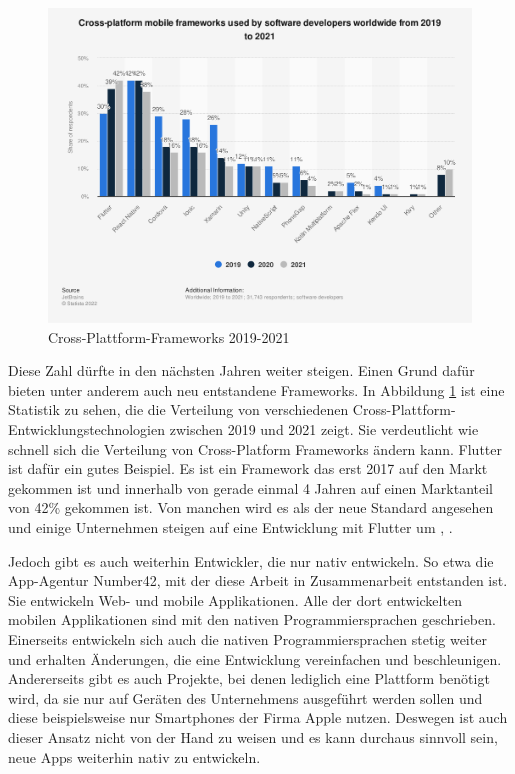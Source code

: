 \begin{figure}[ht]
  \centering
  \includegraphics[width=15cm,keepaspectratio]{images/cross-platform-mobile-frameworks.png} 
  \caption[Statistik Cross-Plattform-Frameworks]{Cross-Plattform-Frameworks 2019-2021 \cite{statist_CP_Framework}}
  \label{fig:statista_cross_plattform}
\end{figure}

Diese Zahl dürfte in den nächsten Jahren weiter steigen. Einen Grund dafür bieten unter anderem auch neu entstandene Frameworks. In Abbildung \ref{fig:statista_cross_plattform} ist eine Statistik zu sehen, die die Verteilung von verschiedenen Cross-Plattform-Entwicklungstechnologien zwischen 2019 und 2021 zeigt. Sie verdeutlicht wie schnell sich die Verteilung von Cross-Platform Frameworks ändern kann. Flutter ist dafür ein gutes Beispiel. Es ist ein Framework das erst 2017 auf den Markt gekommen ist und innerhalb von gerade einmal 4 Jahren auf einen Marktanteil von 42\% gekommen ist. Von manchen wird es als der neue Standard angesehen und einige Unternehmen steigen auf eine Entwicklung mit Flutter um \cite{flutter_move_to}, \cite{flutter_move_to_dart}. 

Jedoch gibt es auch weiterhin Entwickler, die nur nativ entwickeln. So etwa die App-Agentur Number42, mit der diese Arbeit in Zusammenarbeit entstanden ist. Sie entwickeln Web- und mobile Applikationen. Alle der dort entwickelten mobilen Applikationen sind mit den nativen Programmiersprachen geschrieben. Einerseits entwickeln sich auch die nativen Programmiersprachen stetig weiter und erhalten Änderungen, die eine Entwicklung vereinfachen und beschleunigen. Andererseits gibt es auch Projekte, bei denen lediglich eine Plattform benötigt wird, da sie nur auf Geräten des Unternehmens ausgeführt werden sollen und diese beispielsweise nur Smartphones der Firma Apple nutzen. Deswegen ist auch dieser Ansatz nicht von der Hand zu weisen und es kann durchaus sinnvoll sein, neue Apps weiterhin nativ zu entwickeln.

